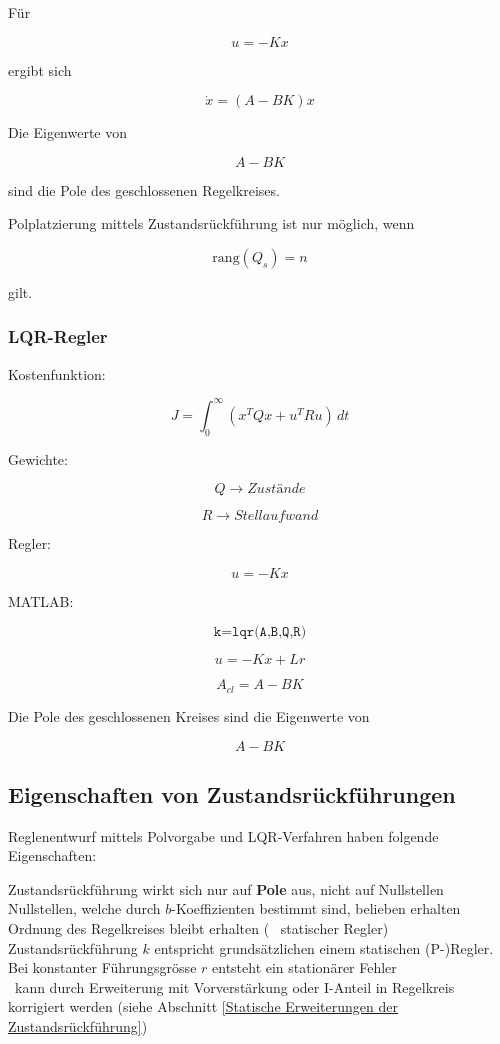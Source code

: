Für

\[
u=-Kx
\]

ergibt sich

\[
\dot x=(A-BK)x
\]

Die Eigenwerte von

\[
A-BK
\]

sind die Pole des geschlossenen Regelkreises.


Polplatzierung mittels Zustandsrückführung ist nur möglich, wenn

\[
\mathrm{rang}(Q_s)=n
\]

gilt.

\subsubsection{LQR-Regler}

Kostenfunktion:

\[
J=
\int_0^\infty
(x^TQx+u^TRu)\,dt
\]

Gewichte:

\[
Q \rightarrow Zustände
\]

\[
R \rightarrow Stellaufwand
\]

Regler:

\[
u=-Kx
\]

MATLAB:

\[
\texttt{k=lqr(A,B,Q,R)}
\]


\[
u=-Kx+Lr
\]

\[
A_{cl}=A-BK
\]

Die Pole des geschlossenen Kreises sind die Eigenwerte von

\[
A-BK
\]
\subsection{Eigenschaften von Zustandsrückführungen}

Reglenentwurf mittels Polvorgabe und LQR-Verfahren haben folgende Eigenschaften:

\smallskip

\begin{outline}
    \1 Zustandsrückführung wirkt sich nur auf \textbf{Pole} aus, nicht auf Nullstellen
        \2 Nullstellen, welche durch $b$-Koeffizienten bestimmt sind, belieben erhalten
    \1 Ordnung des Regelkreises bleibt erhalten ( \textrightarrow\ statischer Regler)
    \1 Zustandsrückführung $k$ entspricht grundsätzlichen einem statischen (P-)Regler.
        \2 Bei konstanter Führungsgrösse $r$ entsteht ein stationärer Fehler \\
            \textrightarrow\ kann durch Erweiterung mit Vorverstärkung oder I-Anteil in Regelkreis korrigiert werden (siehe Abschnitt \ref{Statische Erweiterungen der Zustandsrückführung})
\end{outline}


